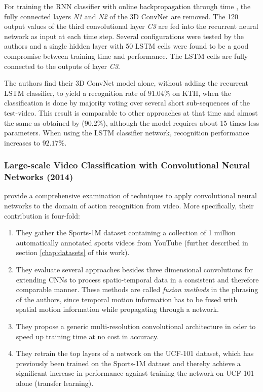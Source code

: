 For training the RNN classifier with online backpropagation through time \cite{gers_learning_2002}, the fully connected layers \textit{N1} and \textit{N2} of the 3D ConvNet are removed.
The 120 output values of the third convolutional layer \textit{C3} are fed into the recurrent neural network as input at each time step.
Several configurations were tested by the authors and a single hidden layer with 50 LSTM cells were found to be a good compromise between training time and performance.
The LSTM cells are fully connected to the outputs of layer \textit{C3}.

The authors find their 3D ConvNet model alone, without adding the recurrent LSTM classifier, to yield a recognition rate of $91.04\%$ on KTH, when the classification is done by majority voting over several short sub-sequences of the test-video.
This result is comparable to other approaches at that time and almost the same as obtained by \textcite{ji_3d_2013} ($90.2\%$), although the model requires about 15 times less parameters.
When using the LSTM classifier network, recognition performance increases to $92.17\%$.


\subsubsection{Large-scale Video Classification with Convolutional Neural Networks (2014)}
\textcite{karpathy_large-scale_2014} provide a comprehensive examination of techniques to apply convolutional neural networks to the domain of action recognition from video.
More specifically, their contribution is four-fold:
\begin{enumerate}
    \item They gather the Sports-1M dataset containing a collection of 1 million automatically annotated sports videos from YouTube (further described in section \ref{chap:datasets} of this work).
    \item They evaluate several approaches besides three dimensional convolutions for extending CNNs to process spatio-temporal data in a consistent and therefore comparable manner. These methods are called \textit{fusion methods} in the phrasing of the authors, since temporal motion information has to be fused with spatial motion information while propagating through a network.
    \item They propose a generic multi-resolution convolutional architecture in oder to speed up training time at no cost in accuracy.
    \item They retrain the top layers of a network on the UCF-101 dataset, which has previously been trained on the Sports-1M dataset and thereby achieve a significant increase in performance against training the network on UCF-101 alone (transfer learning).
\end{enumerate}

